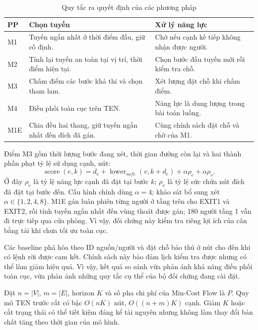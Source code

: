 \begin{table}[htbp]\centering\caption{Quy tắc ra quyết định của các phương pháp}
\small\begin{tabularx}{\linewidth}{P{1cm}P{4.2cm}X}\toprule
PP & Chọn tuyến & Xử lý năng lực\\\midrule
M1 & Tuyến ngắn nhất ở thời điểm đầu, giữ cố định. & Chờ nếu cạnh kế tiếp không nhận được người.\\
M2 & Tính lại tuyến an toàn tại vị trí, thời điểm hiện tại. & Chọn bước đầu tuyến mới rồi kiểm tra chỗ.\\
M3 & Chấm điểm các bước khả thi và chọn tham lam. & Xét lượng đặt chỗ khi chấm điểm.\\
M4 & Điều phối toàn cục trên TEN. & Năng lực là dung lượng trong bài toán luồng.\\
M1E & Chia đều hai thang, giữ tuyến ngắn nhất đến đích đã gán. & Cùng chính sách đặt chỗ và chờ của M1.\\\bottomrule
\end{tabularx}\end{table}
Điểm M3 gồm thời lượng bước đang xét, thời gian đường còn lại và hai thành phần phạt tỷ lệ sử dụng cạnh, nút:
\begin{equation}\operatorname{score}(e,k)=d_e+\operatorname{lower}_{safe}(v,k+d_e)+\alpha\rho_e+\alpha\rho_v.\end{equation}
Ở đây $\rho_e$ là tỷ lệ năng lực cạnh đã đặt tại bước $k$; $\rho_v$ là tỷ lệ sức chứa nút đích đã đặt tại bước đến. Cấu hình chính dùng $\alpha=4$; khảo sát bổ sung xét $\alpha\in\{1,2,4,8\}$. M1E gán luân phiên từng người ở tầng trên cho EXIT1 và EXIT2, rồi tính tuyến ngắn nhất đến vùng thoát được gán; 180 người tầng 1 vẫn đi trực tiếp qua cửa phòng. Vì vậy, đối chứng này kiểm tra riêng lợi ích của cân bằng tải khi chưa tối ưu toàn cục.

Các baseline phá hòa theo ID nguồn/người và đặt chỗ bảo thủ ở nút cho đến khi có lệnh rời được cam kết. Chính sách này bảo đảm lịch kiểm tra được nhưng có thể làm giảm hiệu quả. Vì vậy, kết quả so sánh vừa phản ánh khả năng điều phối toàn cục, vừa phản ánh những quy tắc cụ thể của bộ đối chứng đang cài đặt.

Đặt $n=|V|$, $m=|E|$, horizon $K$ và số pha chi phí của Min-Cost Flow là $P$. Quy mô TEN trước cắt có bậc $O(nK)$ nút, $O((n+m)K)$ cạnh. Giảm $K$ hoặc cắt trạng thái có thể tiết kiệm đáng kể tài nguyên nhưng không làm thay đổi bản chất tăng theo thời gian của mô hình.

